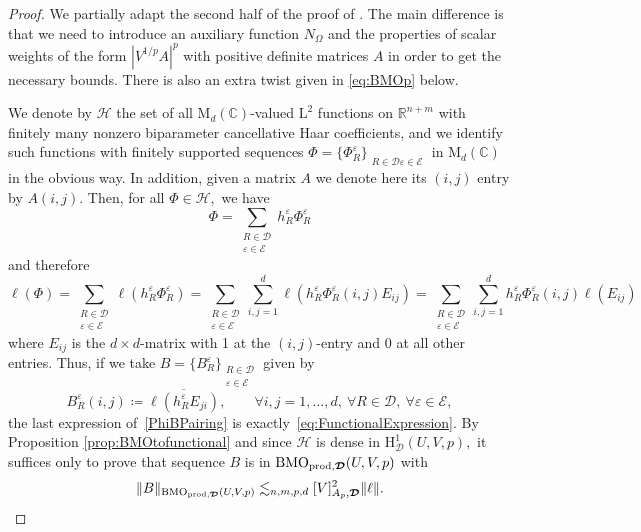 \documentclass{article}
\theoremstyle{definition}
\theoremstyle{remark}
\numberwithin{equation}{section}
\newcommand{\cE}{\mathcal{E}}
\newcommand{\cH}{\mathcal{H}}
\newcommand{\bfD}{\bm{\mathcal{D}}}
\newcommand{\e}{\varepsilon}
\newcommand{\reals}{\mathbb{R}}
\newcommand{\complex}{\mathbb{C}}
\newcommand{\Lp}[1]{\mathrm{L}^{#1}}
\newcommand{\1}{\mathbf{1}}
\newcommand{\BMOprodD}{\ensuremath\text{BMO}_{\text{prod},\bfD}}
\begin{document}
    \begin{proof}
        We partially adapt the second half of the proof of \cite[Theorem 1.3]{Isralowitz_2017}.
        The main difference is that we need to introduce an auxiliary function
        $N_\Omega$ and the properties of scalar weights of the form $|V^{1/p}A|^{p}$
        with positive definite matrices $A$ in order to get the necessary bounds. There is also an extra twist given in \eqref{eq:BMOp} below.
        
        We denote by $\cH$ the set of all $\mathrm{M}_{d}(\complex)$-valued $\Lp{2}$ functions on $\reals^{n+m}$ with finitely many nonzero biparameter cancellative Haar coefficients, and we identify such functions with finitely supported sequences $\Phi=\{\Phi_{R}^{\e}\}_{\substack{R\in\bfD\e\in\cE}}$ in $\mathrm{M}_{d}(\complex)$ in the obvious way.
        In addition, given a matrix $A$ we denote here its $(i,j)$ entry by $A(i,j).$
        Then, for all $\Phi\in\cH,$ we have
        \begin{equation*}
            \Phi=\sum_{\substack{R\in\bfD\\\e\in\cE}}h_{R}^{\e}\Phi_{R}^{\e}
        \end{equation*}
        and therefore
        \begin{equation}
            \label{PhiBPairing}
            \ell(\Phi)=\sum_{\substack{R\in\bfD\\\e\in\cE}}\ell(h_{R}^{\e}\Phi_{R}^{\e})=\sum_{\substack{R\in\bfD\\\e\in\cE}}\sum_{i,j=1}^{d}\ell(h_{R}^{\e}\Phi_{R}^{\e}(i,j)E_{ij})
            =\sum_{\substack{R\in\bfD\\\e\in\cE}}\sum_{i,j=1}^{d}h_{R}^{\e}\Phi_{R}^{\e}(i,j)\ell(E_{ij})
        \end{equation}
        where $E_{ij}$ is the $d\times d$-matrix with 1 at the $(i,j)$-entry and 0 at all other entries.
        Thus, if we take $B=\{B_{R}^{\e}\}_{\substack{R\in\bfD\\\e\in\cE}}$ given by
        \begin{equation*}
            B_{R}^{\e}(i,j)\coloneq \overline{\ell(h_{R}^{\e}E_{ji})},\qquad\forall i,j=1,\ldots,d,~\forall R\in\bfD,~\forall\e\in\cE,
        \end{equation*}
        the last expression of~\eqref{PhiBPairing} is exactly~\eqref{eq:FunctionalExpression}. 
        By Proposition \ref{prop:BMOtofunctional} and since $\cH$ is dense in $\mathrm{H}^1_{\bfD}(U,V,p),$ it suffices only to prove that sequence $B$ is in $\BMOprodD(U,V,p)$ with
        \begin{equation}
            \label{BMOestimate}
            \Vert B\Vert_{\BMOprodD(U,V,p)}\lesssim_{n,m,p,d}[V]_{A_{p},\bfD}^{2}\Vert\ell\Vert.
        \end{equation}


\end{proof}
\end{document}
